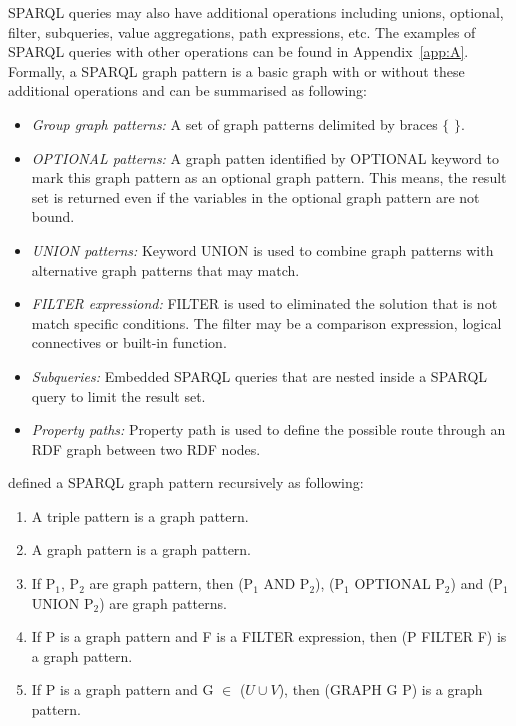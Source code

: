 {SPARQL queries may also have additional operations including unions, optional, filter, subqueries, value aggregations, path expressions, etc.
The examples of SPARQL queries with other operations can be found in Appendix~\ref{app:A}.
Formally, a SPARQL graph pattern is a basic graph with or without these additional operations and can be summarised as following:
\begin{itemize}[noitemsep,nolistsep]
\item \textit{Group graph patterns:} A set of graph patterns delimited by braces $\{$ $\}$.
\item \textit{OPTIONAL patterns:} A graph patten identified by OPTIONAL keyword to mark this graph pattern as an optional graph pattern. 
                                  This means, the result set is returned even if the variables in the optional graph pattern are not bound.
\item \textit{UNION patterns:} Keyword UNION is used to combine graph patterns with alternative graph patterns that may match.
\item \textit{FILTER expressiond:} FILTER is used to eliminated the solution that is not match specific conditions. 
                                   The filter may be a comparison expression, logical connectives or built-in function.
\item \textit{Subqueries:} Embedded SPARQL queries that are nested inside a SPARQL query to limit the result set.
\item \textit{Property paths:} Property path is used to define the possible route through an RDF graph between two RDF nodes. 
\end{itemize}

\cite{Perez:2009} defined a SPARQL graph pattern recursively as following:
\begin{enumerate}
\item A triple pattern is a graph pattern.
\item A graph pattern is a graph pattern.
\item If P$_{1}$, P$_{2}$ are graph pattern, then (P$_{1}$ AND P$_{2}$), (P$_{1}$ OPTIONAL P$_{2}$) and (P$_{1}$ UNION P$_{2}$) are graph patterns. 
\item If P is a graph pattern and F is a FILTER expression, then (P FILTER F) is a graph pattern.
\item If P is a graph pattern and G $\in$ ($U \cup V$), then (GRAPH G P) is a graph pattern.
\end{enumerate}

}
